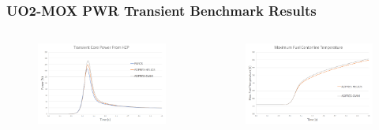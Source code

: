 \documentclass{beamer}
\begin{document}
\begin{frame}[fragile] %
\frametitle{UO2-MOX PWR Transient Benchmark Results}
\begin{columns}[c] %
\begin{figure}
\includegraphics[width=0.9\linewidth]{power2.png}
\end{figure}
\begin{figure}
\includegraphics[width=0.9\linewidth]{ftem.png}
\end{figure}


\end{columns}
\end{frame}
\end{document}
